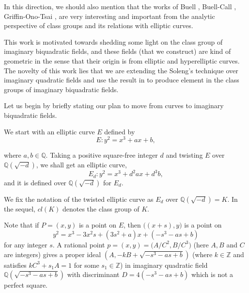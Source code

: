 \documentclass[12pt, 14paper]{amsart}
\theoremstyle{plain}
\numberwithin{equation}{section}
\newcommand \ZZ {{\mathbb Z}}
\newcommand \QQ {{\mathbb Q}}
\begin{document}
In this direction, we should also mention that the works of Buell \cite{B}, Buell-Call \cite{BC}, Griffin-Ono-Tsai \cite{GOT}, are very interesting and important from the analytic perspective of class groups and its relations with elliptic curves.

This work is motivated towards shedding some light on the class group of imaginary biquadratic fields, and these fields (that we construct) are kind of geometric in the sense that their origin is from elliptic and hyperelliptic curves. The novelty of this work lies that we are extending the Soleng's technique over imaginary quadratic fields and use the result in \cite{BH} to produce element in the class groups of imaginary biquadratic fields.

Let us begin by briefly stating our plan to move from curves to imaginary biquadratic fields. 


We start with an elliptic curve $E$ defined by
\begin{equation}
\label{eq:1.1}
    E: y^2 = x^3 + ax +b,
\end{equation}

where $a,b \in \QQ$. Taking a positive square-free integer $d$ and twisting $E$ over $\QQ(\sqrt{-d})$,
we shall get an elliptic curve,
\begin{equation}
\label{eq:1.2}
E_d: y^2 = x^3 +d^2 ax + d^3 b,
\end{equation}
and it is defined over $\QQ(\sqrt{-d})$ for $E_d$.

 We fix the notation of the twisted elliptic curve as $E_d$ over $\QQ(\sqrt{-d})= K$. In the sequel, $cl(K)$ denotes the class group of $K$.

 
 
 Note that if $P = (x,y)$ 
 is a point on $E$, 
then $\bigg((x+s), y\bigg)$ is a point on 
\begin{equation}
\label{eq:1.3}
y^2 = x^3 -3x^2s + (3s^2 +a)x + (-s^3 -as + b)
\end{equation}
for any integer $s$.
A rational point $p=(x,y)=\bigg(A/C^2, B/C^3 \bigg)$ (here $A,B$ and $C$ are integers) gives a proper ideal $ (A, -kB + \sqrt {-s^3 -as + b})$
(where $k \in \ZZ$ and satisfies $kC^3 + s_1 A = 1$ for some $s_1 \in \ZZ$) in 
imaginary quadratic field $\QQ (\sqrt{-s^3 -as + b})$ with discriminant $D= 4( -s^3 -as + b)$ which is not a perfect square.
\end{document}
